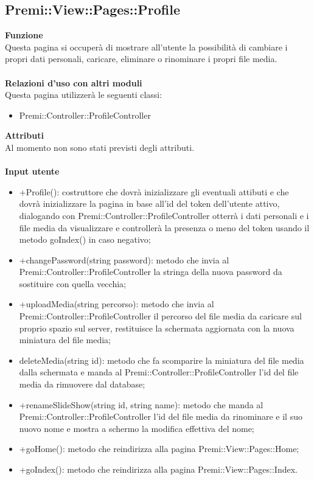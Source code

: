 {					\subsection{Premi::View::Pages::Profile}{
						\textbf{Funzione}\\
						\indent Questa pagina si occuperà di mostrare all'utente la possibilità di cambiare i propri dati personali, caricare, eliminare o rinominare i propri file media.\\\\
						\textbf{Relazioni d'uso con altri moduli}\\
						\indent Questa pagina utilizzerà le seguenti classi:
						\begin{itemize}
							\item Premi::Controller::ProfileController
						\end{itemize}
						\textbf{Attributi}\\
						\indent Al momento non sono stati previsti degli attributi.\\\\
						\textbf{Input utente}
						\begin{itemize}
							\item +Profile(): costruttore che dovrà inizializzare gli eventuali attibuti e che dovrà inizializzare la pagina in base all'id del token dell'utente attivo, dialogando con Premi::Controller::ProfileController otterrà i dati personali e i file media da visualizzare e controllerà la presenza o meno del token usando il metodo goIndex() in caso negativo;
							\item +changePassword(string password): metodo che invia al Premi::Controller::ProfileController la stringa della nuova password da sostituire con quella vecchia;
							\item +uploadMedia(string percorso): metodo che invia al Premi::Controller::ProfileController il percorso del file media da caricare sul proprio spazio sul server, restituisce la schermata aggiornata con la nuova miniatura del file media;
							\item deleteMedia(string id): metodo che fa scomparire la miniatura del file media dalla schermata e manda al Premi::Controller::ProfileController l'id del file media da rimuovere dal database;
							\item +renameSlideShow(string id, string name): metodo che manda al Premi::Controller::ProfileController l'id del file media da rinominare e il suo nuovo nome e mostra a schermo la modifica effettiva del nome;
							\item +goHome(): metodo che reindirizza alla pagina Premi::View::Pages::Home;
							\item +goIndex(): metodo che reindirizza alla pagina Premi::View::Pages::Index.
						\end{itemize}
					}
}
